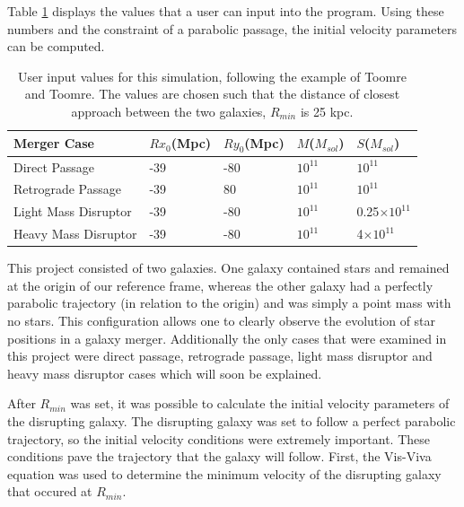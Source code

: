 \documentclass[11pt]{article}
\begin{document}
Table \ref{table2} displays the values that a user can input into the program. Using these numbers and the constraint of a parabolic passage, the initial velocity parameters can be computed.

\begin{table}[h!]
\centering
\caption{User input values for this simulation, following the example of Toomre and Toomre.  The values are chosen such that the distance of closest approach between the two galaxies, $R_{min}$ is 25 kpc.}
\begin{ruledtabular}
\begin{tabular}{l l l l l}
Merger Case & $Rx_0$(Mpc) & $Ry_0$(Mpc) & $M$($M_{sol}$) & $S$($M_{sol}$) \\
\hline	%
Direct Passage & -39 & -80 & $10^{11}$ & $10^{11}$ \\
Retrograde Passage & -39 & 80 & $10^{11}$ & $10^{11}$ \\
Light Mass Disruptor & -39 & -80 & $10^{11}$ & 0.25$\times10^{11}$ \\
Heavy Mass Disruptor & -39 & -80 & $10^{11}$ & 4$\times10^{11}$ \\
\end{tabular}
\end{ruledtabular}
\label{table2}
\end{table}


This project consisted of two galaxies.  One galaxy contained stars and remained at the origin of our reference frame, whereas the other galaxy had a perfectly parabolic trajectory (in relation to the origin) and was simply a point mass with no stars.  This configuration allows one to clearly observe the evolution of star positions in a galaxy merger.  Additionally the only cases that were examined in this project were direct passage, retrograde passage, light mass disruptor and heavy mass disruptor cases which will soon be explained. 

After $R_{min}$ was set, it was possible to calculate the initial velocity parameters of the disrupting galaxy.  The disrupting galaxy was set to follow a perfect parabolic trajectory, so the initial velocity conditions were extremely important. These conditions pave the trajectory that the galaxy will follow.  First, the Vis-Viva equation was used to determine the minimum velocity of the disrupting galaxy that occured at $R_{min}$.  
\end{document}

